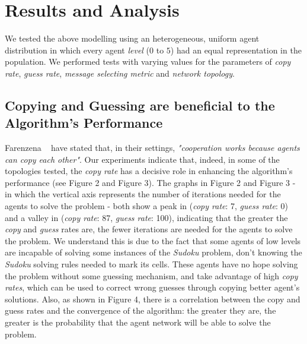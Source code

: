 \documentclass[letterpaper]{article}
\begin{document}
\section{Results and Analysis}

We tested the above modelling using an heterogeneous, uniform agent distribution in which every agent {\em level} ($0$ to $5$) had an equal representation in the population. We performed tests with varying values for the parameters of {\em copy rate}, {\em guess rate}, {\em message selecting metric} and {\em network topology}.

\subsection{Copying and Guessing are beneficial to the Algorithm's Performance}

Farenzena ~\cite{farenzena:collabem} have stated that, in their settings, {\em "cooperation works because agents can copy each other"}. Our experiments indicate that, indeed, in some of the topologies tested, the {\em copy rate} has a decisive role in enhancing the algorithm's performance (see Figure 2 and Figure 3). The graphs in Figure 2 and Figure 3 - in which the vertical axis represents the number of iterations needed for the agents to solve the problem - both show a peak in ({\em copy rate}: 7, {\em guess rate}: 0) and a valley in ({\em copy rate}: 87, {\em guess rate}: 100), indicating that the greater the {\em copy} and {\em guess} rates are, the fewer iterations are needed for the agents to solve the problem. We understand this is due to the fact that some agents of low levels are incapable of solving some instances of the {\em Sudoku} problem, don't knowing the {\em Sudoku} solving rules needed to mark its cells. These agents have no hope solving the problem without some guessing mechanism, and take advantage of high {\em copy rates}, which can be used to correct wrong guesses through copying better agent's solutions. Also, as shown in Figure 4, there is a correlation between the copy and guess rates and the convergence of the algorithm: the greater they are, the greater is the probability that the agent network will be able to solve the problem.
\end{document}
